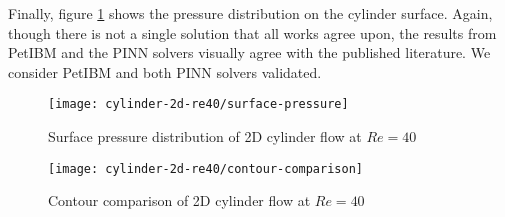 Finally, figure \ref{fig:cylinder-re40-pinn-surfp} shows the pressure distribution on the cylinder surface.
Again, though there is not a single solution that all works agree upon, the results from PetIBM and the PINN solvers visually agree with the published literature.
We consider PetIBM and both PINN solvers validated.

\begin{figure}
    \centering%
    \texttt{[image: cylinder-2d-re40/surface-pressure]}%
    \caption{%
        Surface pressure distribution of 2D cylinder flow at $Re=\num{40}$
    }
    \label{fig:cylinder-re40-pinn-surfp}%
\end{figure}

\begin{figure*}
    \centering%
    \texttt{[image: cylinder-2d-re40/contour-comparison]}%
    \caption{%
        Contour comparison of 2D cylinder flow at $Re=\num{40}$
    }
    \label{fig:cylinder-re40-contours}%
\end{figure*}

